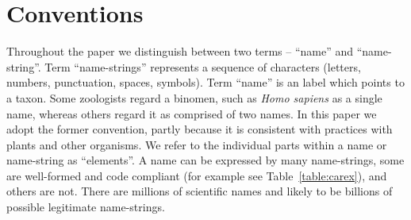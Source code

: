 \documentclass{bmcart}
\begin{document}
\begin{frontmatter}
\begin{abstractbox}
\begin{keyword}
\end{keyword}


\end{abstractbox}
%

\end{frontmatter}



\section*{Conventions}

Throughout the paper we distinguish between two terms -- ``name'' and
``name-string''. Term ``name-strings'' represents a sequence of characters
(letters, numbers, punctuation, spaces, symbols). Term ``name'' is an label
which points to a taxon. Some zoologists  regard a binomen, such as \textit{Homo sapiens} 
as a single name, whereas others regard it as comprised of two names.  
In this paper we adopt the former convention, partly because it is consistent 
with practices with plants and other organisms. We refer to the individual parts within
a name or name-string as ``elements''. A name can be expressed by many name-strings, some are
well-formed and code compliant (for example see
Table~\ref{table:carex}), and others are not.  There are millions of scientific names and likely to be billions
of possible legitimate name-strings.
\end{document}
